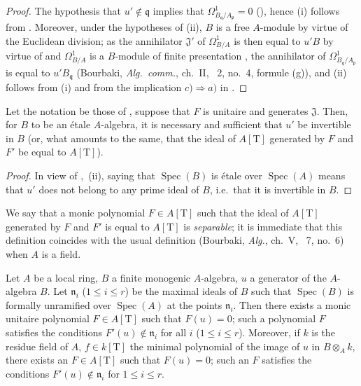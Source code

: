 \begin{proof}
The hypothesis that $u'\notin\mathfrak{q}$ implies that $\Omega^1_{B_\mathfrak{q}/A_\mathfrak{p}}=0$ (), hence (i) follows from .
Moreover, under the hypotheses of (ii), $B$ is a free $A$-module by virtue of the Euclidean division;
as the annihilator $\mathfrak{J}'$ of $\Omega^1_{B/A}$ is then equal to $u'B$ by virtue of  and $\Omega^1_{B/A}$ is a $B$-module of finite presentation , the annihilator of $\Omega^1_{B_\mathfrak{q}/A_\mathfrak{p}}$ is equal to $u'B_\mathfrak{q}$ (Bourbaki, \emph{Alg.\ comm.}, ch.~II, \textsection~2, no.~4, formule (g)), and (ii) follows from (i) and from the implication $c)\Rightarrow a)$ in .
\end{proof}

\begin{corollary}[18.4.3]
\label{IV.18.4.3}
Let the notation be those of , suppose that $F$ is unitaire and generates $\mathfrak{J}$.
Then, for $B$ to be an \'etale $A$-algebra, it is necessary and sufficient that $u'$ be invertible in $B$ (or, what amounts to the same, that the ideal of $A[\mathrm{T}]$ generated by $F$ and $F'$ be equal to $A[\mathrm{T}]$).
\end{corollary}

\begin{proof}
In view of ,~(ii), saying that $\operatorname{Spec}(B)$ is \'etale over $\operatorname{Spec}(A)$ means that $u'$ does not belong to any prime ideal of $B$, i.e.\ that it is invertible in $B$.
\end{proof}

We say that a monic polynomial $F\in A[\mathrm{T}]$ such that the ideal of $A[\mathrm{T}]$ generated by $F$ and $F'$ is equal to $A[\mathrm{T}]$ is \emph{separable};
it is immediate that this definition coincides with the usual definition (Bourbaki, \emph{Alg.}, ch.~V, \textsection~7, no.~6) when $A$ is a field.

\begin{lemma}[18.4.4]
\label{IV.18.4.4}
Let $A$ be a local ring, $B$ a finite monogenic $A$-algebra, $u$ a generator of the $A$-algebra $B$.
Let $\mathfrak{n}_i$ ($1\leq i\leq r$) be the maximal ideals of $B$ such that $\operatorname{Spec}(B)$ is formally unramified over $\operatorname{Spec}(A)$ at the points $\mathfrak{n}_i$.
Then there exists a monic unitaire polynomial $F\in A[\mathrm{T}]$ such that $F(u)=0$;
such a polynomial $F$ satisfies the conditions $F'(u)\notin\mathfrak{n}_i$ for all $i$ ($1\leq i\leq r$).
Moreover, if $k$ is the
residue field of $A$, $f\in k[\mathrm{T}]$ the minimal polynomial of the image of $u$ in $B\otimes_A k$, there exists an $F\in A[\mathrm{T}]$ such that $F(u)=0$;
such an $F$ satisfies the conditions $F'(u)\notin\mathfrak{n}_i$ for $1\leq i\leq r$.
\end{lemma}


